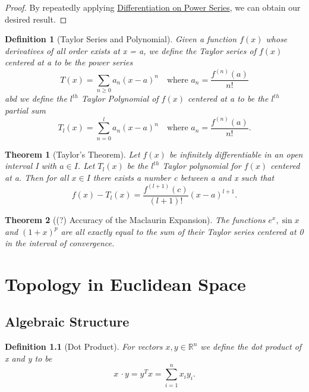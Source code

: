 \documentclass[11pt, oneside]{book}
\theoremstyle{break}
\newtheorem{thm}{Theorem}[section]
\newtheorem*{proof}{Proof}
\newtheorem{defn}{Definition}[section]
\newcommand{\bb}[1]{\mathbb{#1}}		%
\newcommand{\dotp}{\, \cdotp}	%
\begin{document}
\begin{proof}
	By repeatedly applying \hyperref[power_series_differentiation]{Differentiation on Power Series}, we can obtain our desired result.
\end{proof}

\begin{defn}[Taylor Series and Polynomial]
	Given a function $f(x)$ whose derivatives of all order exists at x = a, we define the Taylor series of $f(x)$ centered at a to be the power series
	\[
		T(x) = \sum_{n \geq 0} a_n (x-a)^n \quad \text{where } a_n = \frac{f^{(n)}(a)}{n!} 
	\]
	abd we define the $l^{th}$ Taylor Polynomial of $f(x)$ centered at a to be the $l^{th}$ partial sum
	\[
		T_l(x) = \sum_{n=0}^{l} a_n (x-a)^n \quad \text{where } a_n = \frac{f^{(n)}(a)}{n!}.
	\]
\end{defn}

\begin{thm}[Taylor's Theorem]
	Let $f(x)$ be infinitely differentiable in an open interval I with $a \in I$. Let $T_l(x)$ be the $l^{th}$ Taylor polynomial for $f(x)$ centered at a. Then for all $x \in I$ there exists a number c between a and x such that
	\[
		f(x) - T_l(x) = \frac{f^{(l + 1)}(c)}{(l + 1)!} (x-a)^{l+1}. 
	\]
\end{thm}

\begin{thm}[(?) Accuracy of the Maclaurin Expansion]
	The functions $e^x, \sin x$ and $(1+x)^p$ are all exactly equal to the sum of their Taylor series centered at 0 in the interval of convergence.
\end{thm}

\chapter{Topology in Euclidean Space}


\section{Algebraic Structure}

\begin{defn}[Dot Product]
	For vectors $x, y \in \bb{R}^n$ we define the dot product of x and y to be
	\begin{equation*}
		x \dotp y = y^T x = \sum_{i=1}^{n} x_i y_i.
	\end{equation*}
\end{defn}
\end{document}

